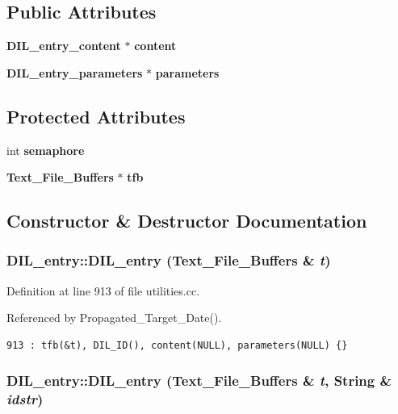 \subsection*{Public Attributes}
\begin{CompactItemize}
\item 
{\bf DIL\_\-entry\_\-content} $\ast$ {\bf content}
\item 
{\bf DIL\_\-entry\_\-parameters} $\ast$ {\bf parameters}
\end{CompactItemize}
\subsection*{Protected Attributes}
\begin{CompactItemize}
\item 
int {\bf semaphore}
\item 
{\bf Text\_\-File\_\-Buffers} $\ast$ {\bf tfb}
\end{CompactItemize}


\subsection{Constructor \& Destructor Documentation}
\subsubsection{\setlength{\rightskip}{0pt plus 5cm}DIL\_\-entry::DIL\_\-entry ({\bf Text\_\-File\_\-Buffers} \& {\em t})}\label{classDIL__entry_a0}




Definition at line 913 of file utilities.cc.

Referenced by Propagated\_\-Target\_\-Date().



\footnotesize\begin{verbatim}913 : tfb(&t), DIL_ID(), content(NULL), parameters(NULL) {}
\end{verbatim}\normalsize 
{}
\subsubsection{\setlength{\rightskip}{0pt plus 5cm}DIL\_\-entry::DIL\_\-entry ({\bf Text\_\-File\_\-Buffers} \& {\em t}, {\bf String} \& {\em idstr})}\label{classDIL__entry_a1}





